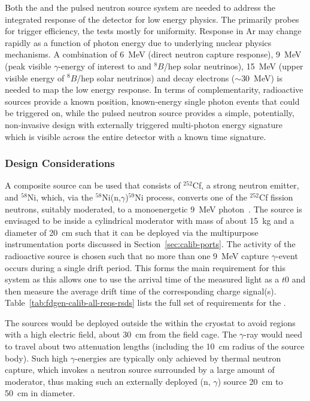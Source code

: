 Both the  and the pulsed neutron source system are needed to address the integrated response of the detector for low energy physics. 
The  primarily probes for trigger efficiency, the  tests mostly for uniformity. Response in Ar may change rapidly as a function of photon energy due to underlying nuclear physics mechanisms. A combination of 6~MeV (direct neutron capture response), 9~MeV (peak visible $\gamma$-energy of interest to  and $^{8}B$/hep solar neutrinos), 15~MeV (upper visible energy of $^{8}B$/hep solar neutrinos) and decay electrons ($\sim$30~MeV) is needed to map the low energy response. In terms of complementarity, radioactive sources provide a known position, known-energy single photon events that could be triggered on, while the pulsed neutron source provides a simple, potentially, non-invasive design with externally triggered multi-photon energy signature which is visible across the entire detector with a known time signature.


\subsubsection{Design Considerations}

A composite source can be used that consists  of $^{252}$Cf, a strong neutron emitter, and $^{58}$Ni, which, via the $^{58}$Ni(n,$\gamma$)$^{59}$Ni process, converts one of the $^{252}$Cf fission neutrons, suitably moderated, to a monoenergetic \SI{9}{\MeV} photon~\cite{Rogers:1996ks}. 
The source is envisaged to be inside a cylindrical moderator with mass of about \SI{15}{kg} and a diameter of \SI{20}{\cm} such that it can be deployed via the multipurpose instrumentation ports discussed in Section~\ref{sec:calib-ports}. The activity of the radioactive source is chosen such that no more than one \SI{9}{\MeV} capture $\gamma$-event occurs during a single drift period. This forms the main requirement for this system as this allows one to use the arrival time of the measured light as a $t0$ and then measure the average drift time of the corresponding charge signal(s). Table~\ref{tab:fdgen-calib-all-reqs-rsds} lists the full set of requirements for the .

The sources would be deployed outside the  within the cryostat to avoid regions with a high electric field, about \SI{30}{\cm} from the field cage. The $\gamma$-ray would need to travel about two attenuation lengths (including the \SI{10}{\cm} radius of the source body). Such high $\gamma$-energies are typically only achieved by thermal neutron capture, which invokes a neutron source surrounded by a large
amount of moderator, thus making such an externally deployed (n, $\gamma$) source \SI{20}{\cm}  to \SI{50}{\cm} %
in diameter. 

